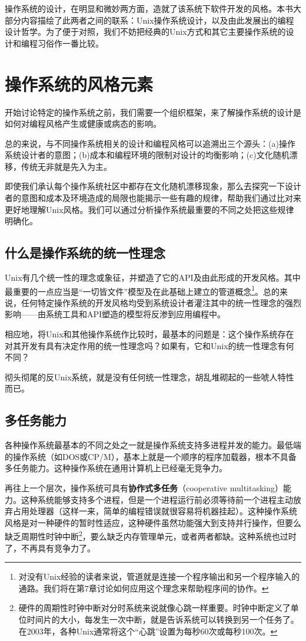 \documentclass[12pt,oneside]{book}
\begin{document}
操作系统的设计，在明显和微妙两方面，造就了该系统下软件开发的风格。本书大部分内容描绘了此两者之间的联系：Unix操作系统设计，以及由此发展出的编程设计哲学。为了便于对照，我们不妨把经典的Unix方式和其它主要操作系统的设计和编程习俗作一番比较。

\section{操作系统的风格元素}
开始讨论特定的操作系统之前，我们需要一个组织框架，来了解操作系统的设计是如何对编程风格产生或健康或病态的影响。

总的来说，与不同操作系统相关的设计和编程风格可以追溯出三个源头：(a)操作系统设计者的意图；(b)成本和编程环境的限制对设计的均衡影响；(c)文化随机漂移，传统无非就是先入为主。

即使我们承认每个操作系统社区中都存在文化随机漂移现象，那么去探究一下设计者的意图和成本及环境造成的局限也能揭示一些有趣的规律，帮助我们通过比对来更好地理解Unix风格。我们可以通过分析操作系统最重要的不同之处把这些规律明确化。

\subsection{什么是操作系统的统一性理念}
Unix有几个统一性的理念或象征，并塑造了它的API及由此形成的开发风格。其中最重要的一点应当是“一切皆文件”模型及在此基础上建立的管道概念\footnote{对没有Unix经验的读者来说，管道就是连接一个程序输出和另一个程序输入的通路。我们将在第7章讨论如何应用这个理念来帮助程序间的协作。}。总的来说，任何特定操作系统的开发风格均受到系统设计者灌注其中的统一性理念的强烈影响——由系统工具和API塑造的模型将反渗到应用编程中。

相应地，将Unix和其他操作系统作比较时，最基本的问题是：这个操作系统存在对其开发有具有决定作用的统一性理念吗？如果有，它和Unix的统一性理念有何不同？

彻头彻尾的反Unix系统，就是没有任何统一性理念，胡乱堆砌起的一些唬人特性而已。

\subsection{多任务能力}
各种操作系统最基本的不同之处之一就是操作系统支持多进程并发的能力。最低端的操作系统（如DOS或CP/M），基本上就是一个顺序的程序加载器，根本不具备多任务能力。这种操作系统在通用计算机上已经毫无竞争力。

再往上一个层次，操作系统可具有\textbf{协作式多任务}（cooperative multitasking）能力。这种系统能够支持多个进程，但是一个进程运行前必须等待前一个进程主动放弃占用处理器（这样一来，简单的编程错误就很容易将机器挂起）。这种操作系统风格是对一种硬件的暂时性适应，这种硬件虽然功能强大到支持并行操作，但要么缺乏周期性时钟中断\footnote{硬件的周期性时钟中断对分时系统来说就像心跳一样重要。时钟中断定义了单位时间片的大小，每发生一次中断，就是告诉系统可以转换到另一个任务了。在2003年，各种Unix通常将这个“心跳”设置为每秒60次或每秒100次。}，要么缺乏内存管理单元，或者两者都缺。这种系统也过时了，不再具有竞争力了。
\end{document}
